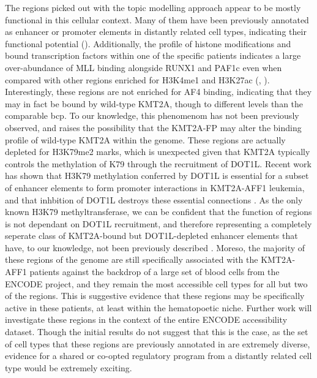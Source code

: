 The regions picked out with the topic modelling approach appear to be mostly functional in this cellular context. Many of them have been previously annotated as enhancer or promoter elements in distantly related cell types, indicating their functional potential (). Additionally, the profile of histone modifications and bound transcription factors within one of the specific patients indicates a large over-abundance of MLL binding alongside RUNX1 and PAF1c even when compared with other regions enriched for H3K4me1 and H3K27ac (, ). Interestingly, these regions are not enriched for AF4 binding, indicating that they may in fact be bound by wild-type KMT2A, though to different levels than the comparable \gls{bcp}. To our knowledge, this phenomenom has not been previously observed, and raises the possibility that the KMT2A-FP may alter the binding profile of wild-type KMT2A within the genome. These regions are actually depleted for H3K79me2 marks, which is unexpected given that KMT2A typically controls the methylation of K79 through the recruitment of DOT1L. Recent work has shown that H3K79 methylation conferred by DOT1L is essential for a subset of enhancer elements to form promoter interactions in KMT2A-AFF1 leukemia, and that inhbition of DOT1L destroys these essential connections \cite{Godfrey2019}. As the only known H3K79 methyltransferase, we can be confident that the function of regions is not dependant on DOT1L recruitment, and therefore representing a completely seperate class of KMT2A-bound but DOT1L-depleted enhancer elements that have, to our knowledge, not been previously described \cite{Q2002}. Moreso, the majority of these regions of the genome are still specifically associated with the KMT2A-AFF1 patients against the backdrop of a large set of blood cells from the ENCODE project, and they remain the most accessible cell types for all but two of the regions. This is suggestive evidence that these regions may be specifically active in these patients, at least within the hematopoetic niche. Further work will investigate these regions in the context of the entire ENCODE accessibility dataset. Though the initial results do not suggest that this is the case, as the set of cell types that these regions are previously annotated in are extremely diverse, evidence for a shared or co-opted regulatory program from a distantly related cell type would be extremely exciting. 

